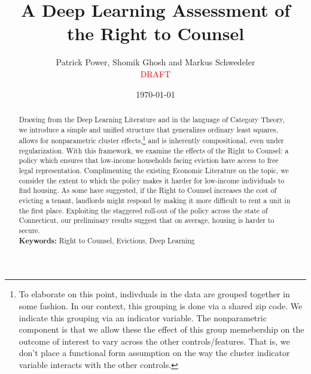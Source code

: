 \documentclass[a4paper,12pt]{article}
\begin{document}
\begin{titlepage}
\title{A Deep Learning Assessment of the Right to Counsel}

\author{Patrick Power, Shomik Ghosh and Markus Schwedeler \\ 
\textcolor{red}{DRAFT}}
\date{\today}
\maketitle
\thispagestyle{empty} %
\vspace{-2em}
\begin{abstract}
Drawing from the Deep Learning Literature and in the language of Category Theory, we introduce a simple and unified structure that generalizes ordinary least squares, allows for nonparametric cluster effects,\footnote{To elaborate on this point, indivduals in the data are grouped together in some fashion. In our context, this grouping is done via a shared zip code. We indicate this grouping via an indicator variable. The nonparametric component is that we allow these the effect of this group memebership on the outcome of interest to vary across the other controls/features. That is, we don't place a functional form assumption on the way the cluster indicator variable interacts with the other controls.} and is inherently compositional, even under regularization. With this framework, we examine the effects of the Right to Counsel: a policy which ensures that low-income households facing eviction have access to free legal representation. Complimenting the existing Economic Literature on the topic, we consider the extent to which the policy makes it harder for low-income individuals to find housing. As some have suggested, if the Right to Counsel increases the cost of evicting a tenant, landlords might respond by making it more difficult to rent a unit in the first place. Exploiting the staggered roll-out of the policy across the state of Connecticut, our preliminary results suggest that on average, housing is harder to secure. 
\vspace{0.2in}\\
\noindent\textbf{Keywords:} Right to Counsel, Evictions, Deep Learning\\
\end{abstract}
\setcounter{page}{1}
\end{titlepage}
\end{document}
